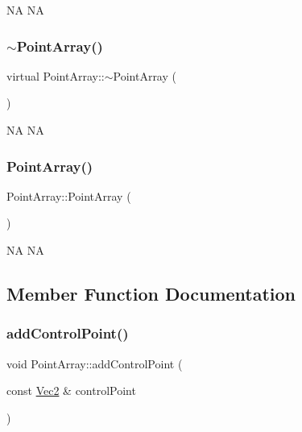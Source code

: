 NA  NA \mbox{\label{classPointArray_a69a3109f812d10e22f489f073fc00b65}} 
\subsubsection{\texorpdfstring{$\sim$\+Point\+Array()}{~PointArray()}\hspace{0.1cm}{\footnotesize\ttfamily [2/2]}}
{\footnotesize\ttfamily virtual Point\+Array\+::$\sim$\+Point\+Array (\begin{DoxyParamCaption}{ }\end{DoxyParamCaption})\hspace{0.3cm}{\ttfamily [virtual]}}

NA  NA \mbox{\label{classPointArray_a508483dca6a6a6333ce3cc379eaa6307}} 
\subsubsection{\texorpdfstring{Point\+Array()}{PointArray()}\hspace{0.1cm}{\footnotesize\ttfamily [2/2]}}
{\footnotesize\ttfamily Point\+Array\+::\+Point\+Array (\begin{DoxyParamCaption}{ }\end{DoxyParamCaption})}

NA  NA 

\subsection{Member Function Documentation}
\mbox{\label{classPointArray_af2994ad7c7fcd61f42a97dc69e1bda99}} 
\subsubsection{\texorpdfstring{add\+Control\+Point()}{addControlPoint()}\hspace{0.1cm}{\footnotesize\ttfamily [1/2]}}
{\footnotesize\ttfamily void Point\+Array\+::add\+Control\+Point (\begin{DoxyParamCaption}\item[{const \hyperlink{classVec2}{Vec2} \&}]{control\+Point }\end{DoxyParamCaption})}

